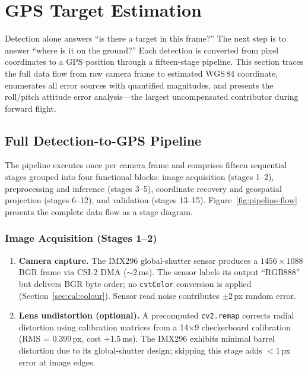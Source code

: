 \documentclass[10pt,a4paper]{article}
\begin{document}
\section{GPS Target Estimation}\label{sec:localisation}

Detection alone answers ``is there a target in this frame?'' The next step is to answer ``where is it on the ground?'' Each detection is converted from pixel coordinates to a GPS position through a fifteen-stage pipeline.  This section traces the full data flow from raw camera frame to estimated WGS\,84 coordinate, enumerates all error sources with quantified magnitudes, and presents the roll/pitch attitude error analysis---the largest uncompensated contributor during forward flight.

\subsection{Full Detection-to-GPS Pipeline}

The pipeline executes once per camera frame and comprises fifteen sequential stages grouped into four functional blocks: image acquisition (stages 1--2), preprocessing and inference (stages 3--5), coordinate recovery and geospatial projection (stages 6--12), and validation (stages 13--15).  Figure~\ref{fig:pipeline-flow} presents the complete data flow as a stage diagram.

\subsubsection{Image Acquisition (Stages 1--2)}

\begin{enumerate}
  \item \textbf{Camera capture.} The IMX296 global-shutter sensor produces a $1456 \times 1088$ BGR frame via CSI-2 DMA (${\sim}$2\,ms).  The sensor labels its output ``RGB888'' but delivers BGR byte order; no \texttt{cvtColor} conversion is applied (Section~\ref{sec:cal:colour}).  Sensor read noise contributes $\pm$2\,px random error.

  \item \textbf{Lens undistortion (optional).} A precomputed \texttt{cv2.remap} corrects radial distortion using calibration matrices from a 14$\times$9 checkerboard calibration (RMS = 0.399\,px, cost $+$1.5\,ms).  The IMX296 exhibits minimal barrel distortion due to its global-shutter design; skipping this stage adds $<$1\,px error at image edges.
\end{enumerate}
\end{document}
